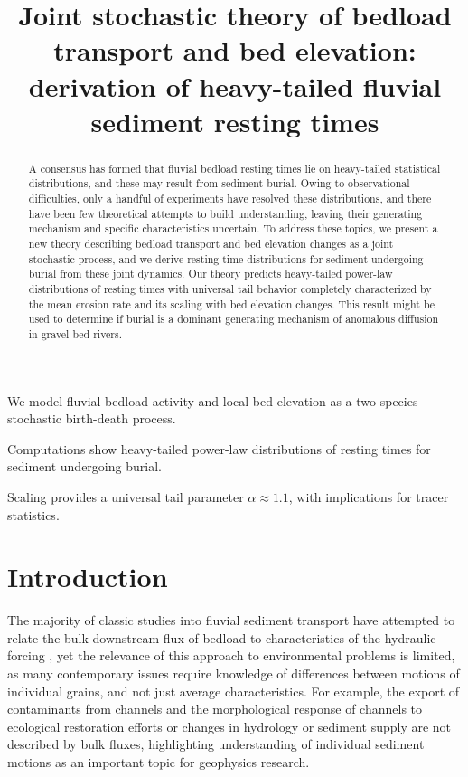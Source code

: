 \documentclass[draft]{agujournal2018}
\begin{document}
\title{Joint stochastic theory of bedload transport and bed elevation: derivation of heavy-tailed fluvial sediment resting times}

\begin{keypoints}
\item We model fluvial bedload activity and local bed elevation as a two-species stochastic birth-death process.
\item Computations show heavy-tailed power-law distributions of resting times for sediment undergoing burial.
\item Scaling provides a universal tail parameter $\alpha\approx1.1$, with implications for tracer statistics.

\end{keypoints}

\begin{abstract}
A consensus has formed that fluvial bedload resting times lie on heavy-tailed statistical distributions, and these may result from sediment burial.
Owing to observational difficulties, only a handful of experiments have resolved these distributions, and there have been few theoretical attempts to build understanding, leaving their generating mechanism and specific characteristics uncertain.
To address these topics, we present a new theory describing bedload transport and bed elevation changes as a joint stochastic process, and we derive resting time distributions for sediment undergoing burial from these joint dynamics.
Our theory predicts heavy-tailed power-law distributions of resting times with universal tail behavior completely characterized by the mean erosion rate and its scaling with bed elevation changes.
This result might be used to determine if burial is a dominant generating mechanism of anomalous diffusion in gravel-bed rivers.
\end{abstract} 

\section{Introduction}

The majority of classic studies into fluvial sediment transport have attempted to relate the bulk downstream flux of bedload to characteristics of the hydraulic forcing \citep[e.g.][]{Yalin1972}, yet the relevance of this approach to environmental problems is limited, as many contemporary issues require knowledge of differences between motions of individual grains, and not just average characteristics.
For example, the export of contaminants from channels \citep[e.g.][]{Malmon2005} and the morphological response of channels to ecological restoration efforts \citep[e.g.][]{Gaeuman2017} or changes in hydrology or sediment supply \citep[e.g.][]{Hassan2017} are not described by bulk fluxes, highlighting understanding of individual sediment motions as an important topic for geophysics research.
\end{document}
